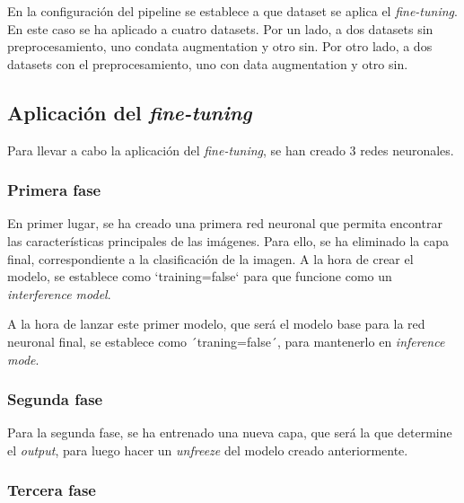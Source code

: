 En la configuración del pipeline se establece a que dataset se aplica el \textit{fine-tuning}. En este caso se ha aplicado a cuatro datasets. 
Por un lado, a dos datasets sin preprocesamiento, uno condata augmentation y otro sin. Por otro lado, a dos datasets con el preprocesamiento, uno con data augmentation y otro sin. 

\subsection{Aplicación del \textit{fine-tuning}}


Para llevar a cabo la aplicación del \textit{fine-tuning}, se han creado 3 redes neuronales.

\subsubsection{Primera fase}


En primer lugar, se ha creado una primera red neuronal que permita encontrar las características principales de las imágenes.
Para ello, se ha eliminado la capa final, correspondiente a la clasificación de la imagen.
A la hora de crear el modelo, se establece como `training=false` para que funcione como un \textit{interference model}.

A la hora de lanzar este primer modelo, que será el modelo base para la red neuronal final, se establece como  ´traning=false´, para mantenerlo en \textit{inference mode}.


\subsubsection{Segunda fase}

Para la segunda fase, se ha entrenado una nueva capa, que será la que determine el \textit{output}, para luego hacer un \textit{unfreeze} del modelo creado anteriormente.

\subsubsection{Tercera fase}

